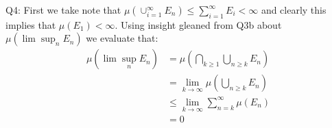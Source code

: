 \documentclass[letterpaper]{article}
\begin{document}
\noindent
Q4: First we take note that $\mu(\cup_{i=1}^{\infty} E_n) \leq \sum_{i=1}^\infty E_i <\infty$ and clearly this implies that $\mu(E_1)<\infty$. Using insight gleaned from Q3b about $\mu(\lim \sup_n E_n)$ we evaluate that:
\begin{align*}
    \mu(\lim \sup_n E_n) &= \mu (\bigcap_{k\geq 1} \bigcup _{n\geq k} E_n) 
    \\ & = \lim_{k \to \infty} \mu(\bigcup_{n\geq k} E_n) \tag{by measure continuity and assumption}
    \\ & \leq \lim_{k \to \infty} \sum_{n=k}^\infty \mu(E_n)
    \\ & = 0 \tag{since the sum converges, the tail must converge to 0}
\end{align*}
\end{document}
